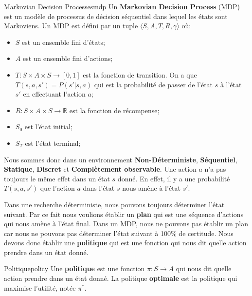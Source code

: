 \begin{definition}{Markovian Decision Processes}{mdp}
    Un \textbf{Markovian Decision Process} (MDP) est un modèle de processus de décision séquentiel dans lequel les états sont Markoviens. Un MDP est défini par un tuple $\langle S, A, T, R, \gamma \rangle$ où:
    \begin{itemize}
        \item $S$ est un ensemble fini d'états;
        \item $A$ est un ensemble fini d'actions;
        \item $T : S \times A \times S \rightarrow [0, 1]$ est la fonction de transition. On a que $T(s, a, s') = P(s' | s, a)$ qui est la probabilité de passer de l'état $s$ à l'état $s'$ en effectuant l'action $a$;
        \item $R : S \times A \times S \rightarrow \mathbb{R}$ est la fonction de récompense;
        \item $S_0$ est l'état initial;
        \item $S_T$ est l'état terminal;
    \end{itemize}
\end{definition}

Nous sommes donc dans un environnement \textbf{Non-Déterministe}, 
\textbf{Séquentiel}, \textbf{Statique}, \textbf{Discret} et \textbf{Complètement observable}. 
Une action $a$ n'a pas toujours le même effet dans un état $s$ donné. En effet, 
il y a une probabilité $T(s, a, s')$ que l'action $a$ dans l'état $s$ nous amène à l'état $s'$. 

Dans une recherche déterministe, nous pouvons toujours déterminer l'état suivant. Par ce fait 
nous voulions établir un \textbf{plan} qui est une séquence d'actions qui nous amène à l'état final. 
Dans un MDP, nous ne pouvons pas établir un plan car nous ne pouvons pas déterminer l'état suivant à 100\%
de certitude. Nous devons donc établir une \textbf{politique} qui est une fonction qui nous dit quelle action 
prendre dans un état donné. 

\begin{definition}{Politique}{policy}
    Une \textbf{politique} est une fonction $\pi : S \rightarrow A$ qui nous dit quelle action prendre dans un état donné. 
    La politique \textbf{optimale} est la politique qui maximise l'utilité, notée $\pi^*$.
\end{definition}


